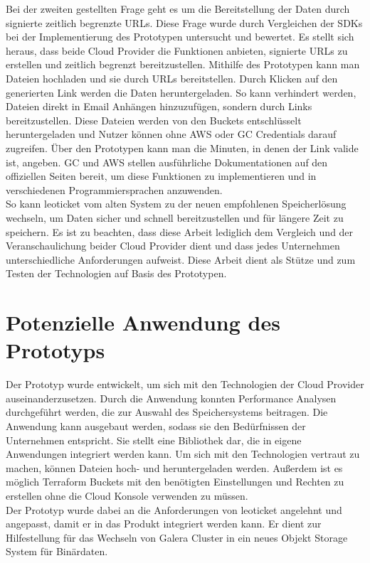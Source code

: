 Bei der zweiten gestellten Frage geht es um die Bereitstellung der Daten durch signierte zeitlich begrenzte URLs. Diese Frage wurde durch Vergleichen der SDKs bei der Implementierung des Prototypen untersucht und bewertet. Es stellt sich heraus, dass beide Cloud Provider die Funktionen anbieten, signierte URLs zu erstellen und zeitlich begrenzt bereitzustellen. Mithilfe des Prototypen kann man Dateien hochladen und sie durch URLs bereitstellen. Durch Klicken auf den generierten Link werden die Daten heruntergeladen. So kann verhindert werden, Dateien direkt in Email Anhängen hinzuzufügen, sondern durch Links bereitzustellen. Diese Dateien werden von den Buckets entschlüsselt heruntergeladen und Nutzer können ohne AWS oder GC Credentials darauf zugreifen. Über den Prototypen kann man die Minuten, in denen der Link valide ist, angeben. GC und AWS stellen ausführliche Dokumentationen auf den offiziellen Seiten bereit, um diese Funktionen zu implementieren und in verschiedenen Programmiersprachen anzuwenden.\\

So kann leoticket vom alten System zu der neuen empfohlenen Speicherlösung wechseln, um Daten sicher und schnell bereitzustellen und für längere Zeit zu speichern. Es ist zu beachten, dass diese Arbeit lediglich dem Vergleich und der Veranschaulichung beider Cloud Provider dient und dass jedes Unternehmen unterschiedliche Anforderungen aufweist. Diese Arbeit dient als Stütze und zum Testen der Technologien auf Basis des Prototypen. 

\section{Potenzielle Anwendung des Prototyps}

Der Prototyp wurde entwickelt, um sich mit den Technologien der Cloud Provider auseinanderzusetzen. Durch die Anwendung konnten Performance Analysen durchgeführt werden, die zur Auswahl des Speichersystems beitragen. Die Anwendung kann ausgebaut werden, sodass sie den Bedürfnissen der Unternehmen entspricht. Sie stellt eine Bibliothek dar, die in eigene Anwendungen integriert werden kann. Um sich mit den Technologien vertraut zu machen, können Dateien hoch- und heruntergeladen werden. Außerdem ist es möglich Terraform Buckets mit den benötigten Einstellungen und Rechten zu erstellen ohne die Cloud Konsole verwenden zu müssen.\\

Der Prototyp wurde dabei an die Anforderungen von leoticket angelehnt und angepasst, damit er in das Produkt integriert werden kann. Er dient zur Hilfestellung für das Wechseln von Galera Cluster in ein neues Objekt Storage System für Binärdaten. 
